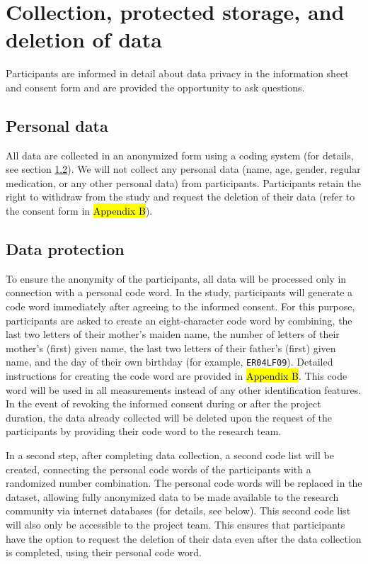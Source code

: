 \documentclass[11pt,twoside,a4paper]{article}
\begin{document}
\section{Collection, protected storage, and deletion of data}

Participants are informed in detail about data privacy in the information sheet and consent form and are provided the opportunity to ask questions.

\subsection{Personal data}

All data are collected in an anonymized form using a coding system (for details, see section \ref{sec:data_protection}).
We will not collect any personal data (name, age, gender, regular medication, or any other personal data) from participants.
Participants retain the right to withdraw from the study and request the deletion of their data (refer to the consent form in \hl{Appendix B}).

\subsection{Data protection}
\label{sec:data_protection}

To ensure the anonymity of the participants, all data will be processed only in connection with a personal code word.
In the study, participants will generate a code word immediately after agreeing to the informed consent.
For this purpose, participants are asked to create an eight-character code word by combining, the last two letters of their mother's maiden name, the number of letters of their mother's (first) given name, the last two letters of their father's (first) given name, and the day of their own birthday (for example, \texttt{ER04LF09}).
Detailed instructions for creating the code word are provided in \hl{Appendix B}.
This code word will be used in all measurements instead of any other identification features.
In the event of revoking the informed consent during or after the project duration, the data already collected will be deleted upon the request of the participants by providing their code word to the research team.

In a second step, after completing data collection, a second code list will be created, connecting the personal code words of the participants with a randomized number combination.
The personal code words will be replaced in the dataset, allowing fully anonymized data to be made available to the research community via internet databases (for details, see below).
This second code list will also only be accessible to the project team.
This ensures that participants have the option to request the deletion of their data even after the data collection is completed, using their personal code word.
\end{document}
